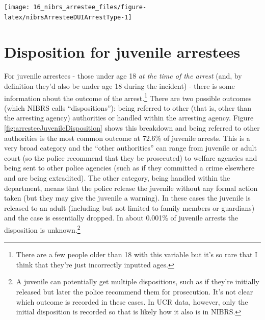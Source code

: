 \documentclass[
]{krantz}
\let\origfigure\figure
\let\endorigfigure\endfigure
\renewenvironment{figure}[1][2] {
    \expandafter\origfigure\expandafter[H]
} {
    \endorigfigure
}
\begin{document}
\begin{figure}

{\centering \texttt{[image: 16\_nibrs\_arrestee\_files/figure-latex/nibrsArresteeDUIArrestType-1]} 

}

\caption{Annual arrest type for DUI arrestees, 1991-2022.}\label{fig:nibrsArresteeDUIArrestType}
\end{figure}

\section{Disposition for juvenile
arrestees}\label{disposition-for-juvenile-arrestees}

For juvenile arrestees - those under age 18 \emph{at the
time of the arrest} (and, by definition they'd also be under
age 18 during the incident) - there is some information
about the outcome of the arrest.\footnote{There are a few
  people older than 18 with this variable but it's so rare
  that I think that they're just incorrectly inputted ages.}
There are two possible outcomes (which NIBRS calls
``dispositions''): being referred to other (that is, other
than the arresting agency) authorities or handled within the
arresting agency. Figure
\ref{fig:arresteeJuvenileDisposition} shows this breakdown
and being referred to other authorities is the most common
outcome at 72.6\% of juvenile arrests. This is a very broad
category and the ``other authorities'' can range from
juvenile or adult court (so the police recommend that they
be prosecuted) to welfare agencies and being sent to other
police agencies (such as if they committed a crime elsewhere
and are being extradited). The other category, being handled
within the department, means that the police release the
juvenile without any formal action taken (but they may give
the juvenile a warning). In these cases the juvenile is
released to an adult (including but not limited to family
members or guardians) and the case is essentially dropped.
In about 0.001\% of juvenile arrests the disposition is
unknown.\footnote{A juvenile can potentially get multiple
  dispositions, such as if they're initially released but
  later the police recommend them for prosecution. It's not
  clear which outcome is recorded in these cases. In UCR
  data, however, only the initial disposition is recorded so
  that is likely how it also is in NIBRS.}
\end{document}

